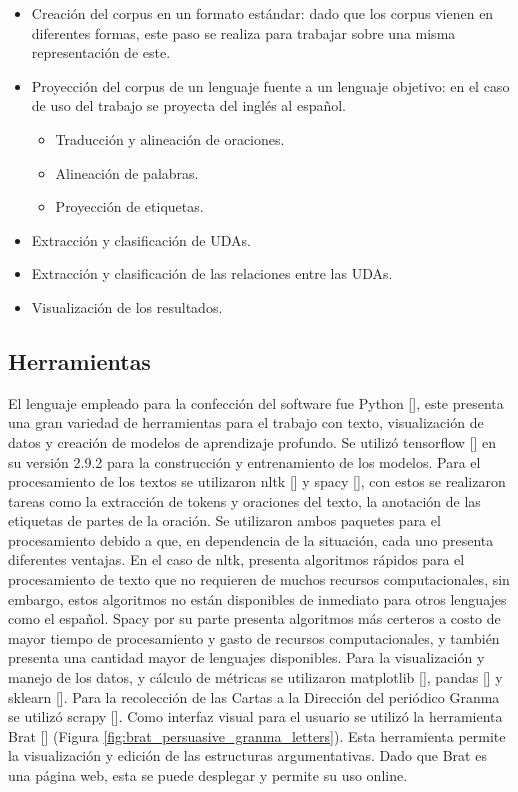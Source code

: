 \begin{itemize}
    \item Creación del corpus en un formato estándar: dado que los corpus vienen en diferentes 
	formas, este paso se realiza para trabajar sobre una misma representación de este.
    \item Proyección del corpus de un lenguaje fuente a un lenguaje objetivo: en el caso de 
	uso del trabajo se proyecta del inglés al español.
    \begin{itemize}
        \item Traducción y alineación de oraciones.
        \item Alineación de palabras.
        \item Proyección de etiquetas.
    \end{itemize}
    \item Extracción y clasificación de UDAs.
    \item Extracción y clasificación de las relaciones entre las UDAs.
    \item Visualización de los resultados.
\end{itemize}

\subsection{Herramientas}

El lenguaje empleado para la confección del software fue Python [\cite{python}], este presenta 
una gran variedad de herramientas 
para el trabajo con texto, visualización de datos y creación de modelos de aprendizaje profundo.
Se utilizó tensorflow [\cite{tensorflow}] en su versión 2.9.2 para la construcción y entrenamiento de los modelos. 
Para el procesamiento de los textos se utilizaron nltk [\cite{nltk}] y spacy [\cite{spacy}], con estos se realizaron tareas
como la extracción de tokens y oraciones del texto, la anotación de las etiquetas de partes de la oración. Se utilizaron 
ambos paquetes para el procesamiento debido a que, en dependencia de la situación, cada uno presenta diferentes
ventajas. En el caso de nltk, presenta algoritmos rápidos para el procesamiento de texto que no 
requieren de muchos recursos computacionales, sin embargo, estos algoritmos no están disponibles de inmediato
para otros lenguajes como el español. Spacy por su parte presenta algoritmos más certeros a costo 
de mayor tiempo de procesamiento y gasto de recursos computacionales, y también presenta una cantidad mayor de lenguajes 
disponibles. Para la visualización y manejo de los datos, y cálculo de métricas se utilizaron 
matplotlib [\cite{matplotlib}], pandas [\cite{pandas}] y sklearn [\cite{sklearn}]. 
Para la recolección de las Cartas a la Dirección del periódico Granma se utilizó scrapy [\cite{scrapy}].
Como interfaz visual para el usuario se utilizó la herramienta Brat [\cite{brat}] 
(Figura \ref{fig:brat_persuasive_granma_letters}). Esta herramienta permite
la visualización y edición de las estructuras argumentativas. Dado que Brat es una página web, esta se puede
desplegar y permite su uso online.

